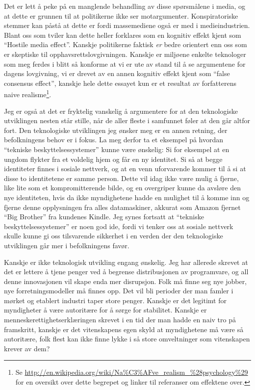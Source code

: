 \documentclass[11pt,norsk,a4paper]{article}
\begin{document}
Det er lett å peke på en manglende behandling av disse spørsmålene i
media, og at dette er grunnen til at politikerne ikke ser
motargumenter. Konspiratoriske stemmer kan påstå at dette er fordi
massemediene også er med i medieindustrien. Blant oss som tviler kan
dette heller forklares som en kognitiv effekt kjent som ``Hostile
media effect''. Kanskje politikerne faktisk \emph{er} bedre orientert
enn oss som er skeptiske til opphavsrettslovgivningen. Kanskje er
miljøene enkelte teknologer som meg ferdes i blitt så konforme at vi
er ute av stand til å se argumentene for dagens lovgivning, vi er
drevet av en annen kognitiv effekt kjent som ``false consensus
effect'', kanskje hele dette essayet kun er et resultat av
forfatterens naive
realisme\footnote{Se \url{http://en.wikipedia.org/wiki/Na\%C3\%AFve_realism_\%28psychology\%29}
for en oversikt over dette begrepet og linker til referanser om
effektene over.}.

Jeg er også at det er fryktelig vanskelig å argumentere for at
den teknologiske utviklingen nesten står stille, når de aller fleste i
samfunnet føler at den går altfor fort. Den teknologiske utviklingen
jeg ønsker meg er en annen retning, der befolkningens behov er i
fokus. La meg derfor ta et eksempel på hvordan ``tekniske
beskyttelsessystemer'' kunne være ønskelig: Si for eksempel at en ungdom
flykter fra et voldelig hjem og får en ny identitet. Si så at begge
identiteter finnes i sosiale nettverk, og at en venn uforvarende
kommer til å si at disse to identitetene er samme person. Dette vil
idag ikke være mulig å fjerne, like lite som et kompromitterende
bilde, og en overgriper kunne da avsløre den nye identiteten, hvis da
ikke myndighetene hadde en mulighet til å komme inn og fjerne denne
opplysningen fra alles datamaskiner, akkurat som Amazon fjernet ``Big
Brother'' fra kundenes Kindle. Jeg synes fortsatt at ``tekniske
beskyttelsessystemer'' er noen god ide, fordi vi tenker oss at sosiale
nettverk skulle kunne gi oss tilsvarende sikkerhet i en verden der den
teknologiske utviklingen går mer i befolkningens favør.

Kanskje er ikke teknologisk utvikling engang ønskelig. Jeg har
allerede skrevet at det er lettere å tjene penger ved å begrense
distribusjonen av programvare, og all denne innovasjonen vil skape
enda mer disrupsjon. Folk må finne seg nye jobber, nye
forretningsmodeller må finnes opp. Det vil bli perioder der man famler
i mørket og etablert industri taper store penger. Kanskje er det
legitimt for myndigheter å være autoritære for å sørge for
stabilitet. Kanskje er menneskerettighetserklæringen skrevet i en tid
der man hadde en naiv tro på framskritt, kanskje er det vitenskapens
egen skyld at myndighetene må være så autoritære, folk flest kan ikke
finne lykke i  så store omveltninger som vitenskapen krever av dem?
\end{document}
